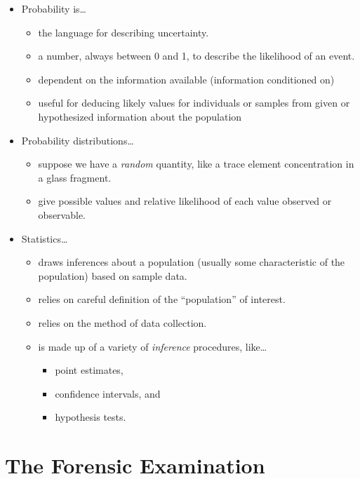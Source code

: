 \documentclass[]{book}
\providecommand{\tightlist}{%
  \setlength{\itemsep}{0pt}\setlength{\parskip}{0pt}}
\theoremstyle{definition}
\theoremstyle{definition}
\theoremstyle{remark}
\begin{document}
\begin{itemize}
\tightlist
\item
  Probability is\ldots{}

  \begin{itemize}
  \tightlist
  \item
    the language for describing uncertainty.
  \item
    a number, always between 0 and 1, to describe the likelihood of an
    event.
  \item
    dependent on the information available (information conditioned on)
  \item
    useful for deducing likely values for individuals or samples from
    given or hypothesized information about the population
  \end{itemize}
\item
  Probability distributions\ldots{}

  \begin{itemize}
  \tightlist
  \item
    suppose we have a \emph{random} quantity, like a trace element
    concentration in a glass fragment.
  \item
    give possible values and relative likelihood of each value observed
    or observable.
  \end{itemize}
\item
  Statistics\ldots{}

  \begin{itemize}
  \tightlist
  \item
    draws inferences about a population (usually some characteristic of
    the population) based on sample data.
  \item
    relies on careful definition of the ``population'' of interest.
  \item
    relies on the method of data collection.
  \item
    is made up of a variety of \emph{inference} procedures, like\ldots{}

    \begin{itemize}
    \tightlist
    \item
      point estimates,
    \item
      confidence intervals, and
    \item
      hypothesis tests.
    \end{itemize}
  \end{itemize}
\end{itemize}

\section{The Forensic Examination}\label{the-forensic-examination}
\end{document}
